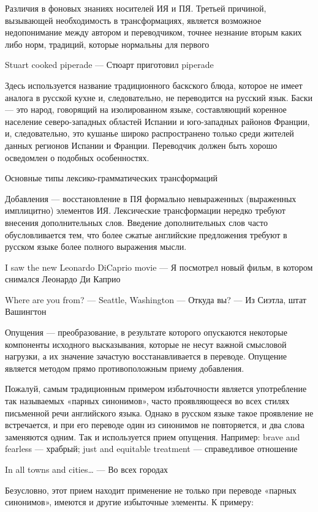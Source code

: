 Различия в фоновых знаниях носителей ИЯ и ПЯ. Третьей причиной, вызывающей необходимость в трансформациях, является возможное недопонимание между автором и переводчиком, точнее незнание вторым каких либо норм, традиций, которые нормальны для первого

Stuart cooked piperade --- Стюарт приготовил piperade 

Здесь используется название традиционного баскского блюда, которое не имеет аналога в русской кухне и, следовательно, не переводится на русский язык. Баски --- это народ, говорящий на изолированном языке, составляющий коренное население северо-западных областей Испании и юго-западных районов Франции, и, следовательно, это кушанье широко распространено только среди жителей данных регионов Испании и Франции. Переводчик должен быть хорошо осведомлен о подобных особенностях.

Основные типы лексико-грамматических трансформаций

Добавления --- восстановление в ПЯ формально невыраженных (выраженных имплицитно) элементов ИЯ. Лексические трансформации нередко требуют внесения дополнительных слов. Введение дополнительных слов часто обусловливается тем, что более сжатые английские предложения требуют в русском языке более полного выражения мысли. 

I saw the new Leonardo DiCaprio movie --- Я посмотрел новый фильм, в котором снимался Леонардо Ди Каприо 

Where are you from? --- Seattle, Washington --- Откуда вы? --- Из Сиэтла, штат Вашингтон 

Опущения --- преобразование, в результате которого опускаются некоторые компоненты исходного высказывания, которые не несут важной смысловой нагрузки, а их значение зачастую восстанавливается в переводе. Опущение является методом прямо противоположным приему добавления.

Пожалуй, самым традиционным примером избыточности является употребление так называемых «парных синонимов», часто проявляющееся во всех стилях письменной речи английского языка. Однако в русском языке такое проявление не встречается, и при его переводе один из синонимов не повторяется, и два слова заменяются одним. Так и используется прием опущения. Например: brave and fearless --- храбрый; just and equitable treatment --- справедливое отношение

In all towns and cities… ---  Во всех городах

Безусловно, этот прием находит применение не только при переводе «парных синонимов», имеются и другие избыточные элементы. К примеру:

